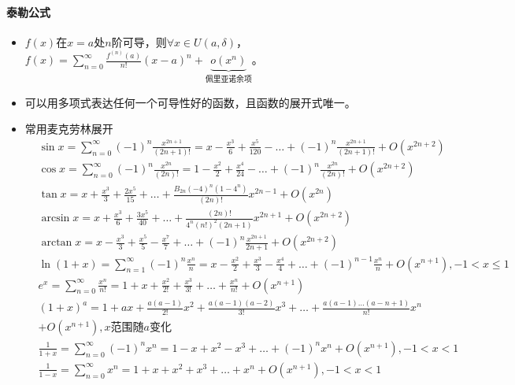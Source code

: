 \documentclass[
12pt, %
a4paper, 
oneside, %
headinclude,footinclude, %
]{scrartcl}
\begin{document}
\paragraph{泰勒公式}
\begin{itemize}
\item $ f(x) $在$ x = a $处$ n $阶可导，则$ \forall x \in U(a, \delta) $，$ f(x) = \sum_{n = 0}^{\infty} \frac{f^{(n)}(a)}{n!}(x - a)^n + \underbrace{o(x^n)}_{\text{佩里亚诺余项}} $。
\item 可以用多项式表达任何一个可导性好的函数，且函数的展开式唯一。
\item 常用麦克劳林展开\label{sec:taylor}
\begin{align*}
&\sin x = \sum_{n = 0}^{\infty} (-1)^n \frac{x^{2n + 1}}{(2n + 1)!} = x - \frac{x^3}{6} + \frac{x^5}{120} - \dots + (-1)^n \frac{x^{2n + 1}}{(2n + 1)!} + O(x^{2n + 2}) \\
&\cos x = \sum_{n = 0}^{\infty} (-1)^n \frac{x^{2n}}{(2n)!} = 1 - \frac{x^2}{2} + \frac{x^4}{24} - \dots + (-1)^n \frac{x^{2n}}{(2n)!} + O(x^{2n + 2}) \\
&\tan x = x + \frac{x^3}{3} + \frac{2x^5}{15} + \dots + \frac{B_{2n} (-4)^n (1 - 4^n)}{(2n)!} x^{2n - 1} + O(x^{2n}) \\
&\arcsin x = x + \frac{x^3}{6} + \frac{3x^5}{40} + \dots + \frac{(2n)!}{4^n (n!)^2 (2n + 1)} x^{2n + 1} + O(x^{2n + 2}) \\
&\arctan x = x - \frac{x^3}{3} + \frac{x^5}{5} - \frac{x^7}{7} + \dots + (-1)^n \frac{x^{2n + 1}}{2n + 1} + O(x^{2n + 2}) \\
&\ln(1 + x) = \sum_{n = 1}^{\infty} (-1)^n \frac{x^n}{n} = x - \frac{x^2}{2} + \frac{x^3}{3} - \frac{x^4}{4} + \dots + (-1)^{n - 1} \frac{x^n}{n} + O(x^{n + 1}), -1 < x \leq 1 \\
&e^x = \sum_{n = 0}^{\infty} \frac{x^n}{n!} = 1 + x + \frac{x^2}{2!} + \frac{x^3}{3!} + \dots + \frac{x^n}{n!} + O(x^{n + 1}) \\
&(1 + x)^a = 1 + ax + \frac{a(a - 1)}{2!}x^2 + \frac{a(a - 1)(a - 2)}{3!}x^3 + \dots + \frac{a(a - 1)\dots(a - n + 1)}{n!}x^n \\
&+ O(x^{n + 1}), x \text{范围随} a \text{变化} \\
&\frac{1}{1 + x} = \sum_{n = 0}^{\infty} (-1)^n x^n = 1 - x + x^2 - x^3 + \dots + (-1)^n x^n + O(x^{n + 1}), -1 < x < 1 \\
&\frac{1}{1 - x} = \sum_{n = 0}^{\infty} x^n = 1 + x + x^2 + x^3 + \dots + x^n + O(x^{n + 1}), -1 < x < 1
\end{align*}
\end{itemize}
\end{document}
